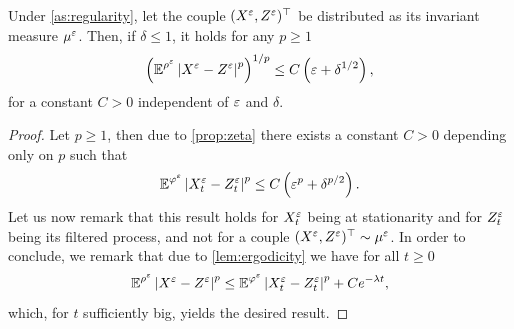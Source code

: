 \documentclass[review,onefignum,onetabnum]{siamonline190516}
\begin{document}
\begin{appendices}
\begin{corollary} \label{cor:distanceZandX} Under \cref{as:regularity}, let the couple $(X^\varepsilon, Z^\varepsilon)^\top$ be distributed as its invariant measure $\mu^\varepsilon$. Then, if $\delta \leq 1$, it holds for any $p \geq 1$
	\begin{equation}
	\left(\operatorname{\mathbb{E}}^{\rho^\varepsilon} \left\lvert X^\varepsilon - Z^\varepsilon\right\rvert^p\right)^{1/p} \leq C\left(\varepsilon + \delta^{1/2}\right),
	\end{equation}
	for a constant $C > 0$ independent of $\varepsilon$ and $\delta$.
\end{corollary}
\begin{proof}
	Let $p \geq 1$, then due to \cref{prop:zeta} there exists a constant $C > 0$ depending only on $p$ such that
	\begin{equation}
	\operatorname{\mathbb{E}}^{\varphi^\varepsilon}\left\lvert X_t^\varepsilon - Z_t^\varepsilon\right\rvert^p \leq C\left(\varepsilon^p + \delta^{p/2}\right).
	\end{equation}
	Let us now remark that this result holds for $X_t^\varepsilon$ being at stationarity and for $Z_t^\varepsilon$ being its filtered process, and not for a couple $(X^\varepsilon, Z^\varepsilon)^\top \sim \mu^\varepsilon$. In order to conclude, we remark that due to \cref{lem:ergodicity} we have for all $t \geq 0$
	\begin{equation}
	\operatorname{\mathbb{E}}^{\rho^\varepsilon} \left\lvert X^\varepsilon - Z^\varepsilon\right\rvert^p \leq \operatorname{\mathbb{E}}^{\varphi^\varepsilon}\left\lvert X_t^\varepsilon - Z_t^\varepsilon\right\rvert^p + Ce^{-\lambda t},
	\end{equation}
	which, for $t$ sufficiently big, yields the desired result.
\end{proof}


\end{appendices}
\end{document}
